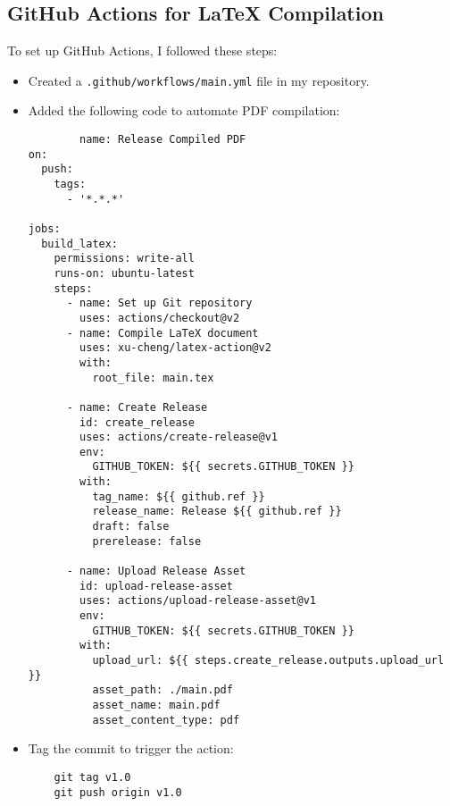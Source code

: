 \documentclass{article}
\begin{document}
\subsection{GitHub Actions for LaTeX Compilation}  
To set up GitHub Actions, I followed these steps:  
\begin{itemize}  
    \item Created a \texttt{.github/workflows/main.yml} file in my repository.  
    \item Added the following code to automate PDF compilation:  
    \begin{verbatim}  
        name: Release Compiled PDF 
on:
  push:
    tags:
      - '*.*.*'

jobs:
  build_latex:
    permissions: write-all
    runs-on: ubuntu-latest
    steps:
      - name: Set up Git repository
        uses: actions/checkout@v2
      - name: Compile LaTeX document
        uses: xu-cheng/latex-action@v2
        with:
          root_file: main.tex

      - name: Create Release
        id: create_release
        uses: actions/create-release@v1
        env:
          GITHUB_TOKEN: ${{ secrets.GITHUB_TOKEN }}
        with:
          tag_name: ${{ github.ref }}
          release_name: Release ${{ github.ref }}
          draft: false
          prerelease: false

      - name: Upload Release Asset
        id: upload-release-asset 
        uses: actions/upload-release-asset@v1
        env:
          GITHUB_TOKEN: ${{ secrets.GITHUB_TOKEN }}
        with:
          upload_url: ${{ steps.create_release.outputs.upload_url }} 
          asset_path: ./main.pdf
          asset_name: main.pdf
          asset_content_type: pdf
    \end{verbatim}  
    \item Tag the commit to trigger the action:  
    \begin{verbatim}  
    git tag v1.0  
    git push origin v1.0  
    \end{verbatim}  
\end{itemize}     
\end{document}
